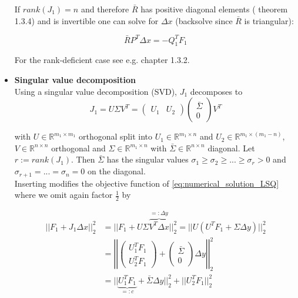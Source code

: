 \documentclass{scrartcl}[12pt, halfparskip]
\numberwithin{equation}{section}
\numberwithin{figure}{section}
\numberwithin{table}{section}
\begin{document}
\begin{itemize}
	If $rank(J_1)=n$ and therefore $\bar{R}$ has positive diagonal elements (\cite{numerical_methods_lsq_Bjorck} theorem 1.3.4) and is invertible  one can solve for $\Delta x$ (backsolve since $\bar{R}$ is triangular):
	
	\begin{equation}
		\bar{R} P^T \Delta x = -Q_1^T F_1
	\end{equation}
	
	For the rank-deficient case see e.g. \cite{numerical_methods_lsq_Bjorck} chapter 1.3.2.
		
		
		
	\item \textbf{Singular value decomposition} \\
	Using a singular value decomposition (SVD), $J_1$ decomposes to
	\begin{equation}
		J_1 = U \Sigma V^T =
		\begin{pmatrix}
			U_1 & U_2
		\end{pmatrix}
		\begin{pmatrix}
			\bar{\Sigma} \\
			0
		\end{pmatrix}
			V^T
	\end{equation}
	
	with $U \in \mathbb{R}^{m_1 \times m_1}$ orthogonal split into $U_1 \in \mathbb{R}^{m_1 \times n}$ and $U_2 \in \mathbb{R}^{m_1 \times (m_1 - n)}$, $V \in \mathbb{R}^{n \times n}$ orthogonal and $\Sigma \in \mathbb{R}^{m_1 \times n}$ with $\bar{\Sigma} \in \mathbb{R}^{n \times n}$ diagonal. Let $r := rank(J_1)$. Then $\bar{\Sigma}$ has the singular values $\sigma_1 \ge \sigma_2 \ge ... \ge \sigma_r > 0$ and $\sigma_{r+1}=...=\sigma_{n} = 0$ on the diagonal. \\
	Inserting modifies the objective function of \cref{eq:numerical_solution_LSQ} where we omit again factor $\frac{1}{2}$ by
	
	\begin{align}
		|| F_1 + J_1 \Delta x ||_2^2 & = || F_1 + U \Sigma \overbrace{V^T \Delta x}^{=: \Delta y} ||_2^2 = || U ( U^T F_1 + \Sigma \Delta y ) ||_2^2 \label{eq:numerical_solution_LSQ_SVD} \\
		& = \left| \left| \begin{pmatrix}
		U_1^T F_1 \\
		U_2^T F_1
		\end{pmatrix} + 
		\begin{pmatrix}
		\bar{\Sigma} \\
		0
		\end{pmatrix}
		\Delta y \right| \right|_2^2 \nonumber \\
		& = || \underbrace{U_1^T F_1}_{=: c} + \bar{\Sigma} \Delta y ||_2^2 + || U_2^T F_1 ||_2^2 \nonumber
	\end{align}
	

\end{itemize}
\end{document}
